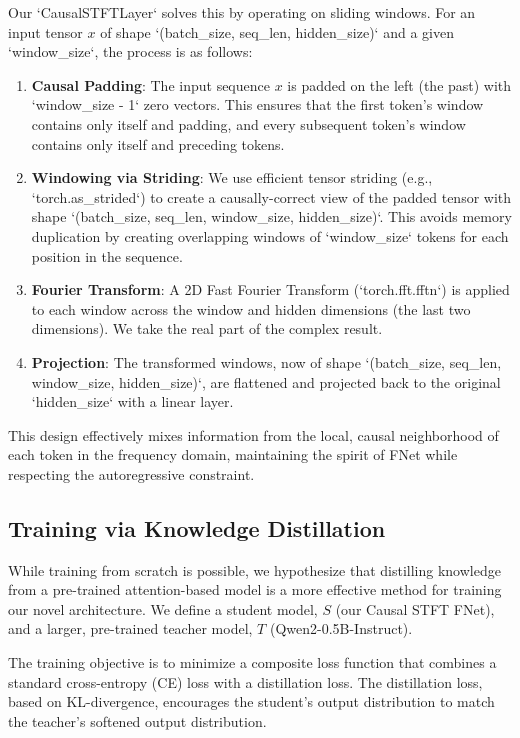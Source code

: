 \documentclass[11pt,a4paper]{article}
\begin{document}
Our `CausalSTFTLayer` solves this by operating on sliding windows. For an input tensor $x$ of shape `(batch_size, seq_len, hidden_size)` and a given `window_size`, the process is as follows:
\begin{enumerate}
    \item \textbf{Causal Padding}: The input sequence $x$ is padded on the left (the past) with `window_size - 1` zero vectors. This ensures that the first token's window contains only itself and padding, and every subsequent token's window contains only itself and preceding tokens.
    \item \textbf{Windowing via Striding}: We use efficient tensor striding (e.g., `torch.as_strided`) to create a causally-correct view of the padded tensor with shape `(batch_size, seq_len, window_size, hidden_size)`. This avoids memory duplication by creating overlapping windows of `window_size` tokens for each position in the sequence.
    \item \textbf{Fourier Transform}: A 2D Fast Fourier Transform (`torch.fft.fftn`) is applied to each window across the window and hidden dimensions (the last two dimensions). We take the real part of the complex result.
    \item \textbf{Projection}: The transformed windows, now of shape `(batch_size, seq_len, window_size, hidden_size)`, are flattened and projected back to the original `hidden_size` with a linear layer.
\end{enumerate}
This design effectively mixes information from the local, causal neighborhood of each token in the frequency domain, maintaining the spirit of FNet while respecting the autoregressive constraint.

\subsection{Training via Knowledge Distillation}
While training from scratch is possible, we hypothesize that distilling knowledge from a pre-trained attention-based model is a more effective method for training our novel architecture. We define a student model, $S$ (our Causal STFT FNet), and a larger, pre-trained teacher model, $T$ (Qwen2-0.5B-Instruct).

The training objective is to minimize a composite loss function that combines a standard cross-entropy (CE) loss with a distillation loss. The distillation loss, based on KL-divergence, encourages the student's output distribution to match the teacher's softened output distribution.
\end{document}
